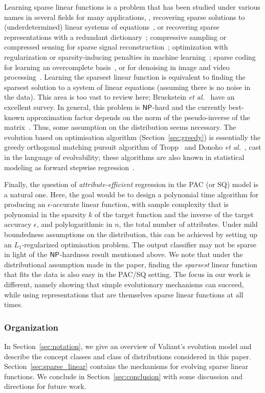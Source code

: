 Learning sparse linear functions is a problem that has been studied under
various names in several fields for many applications, \eg, recovering sparse
solutions to (underdetermined) linear systems of
equations~\cite{Donoho:2009-sparse}, or recovering sparse representations with a
redundant dictionary~\cite{Mallat:2008,Elad:2010}; compressive sampling or
compressed sensing for sparse signal reconstruction~\cite{Candes:2008};
optimization with regularization or sparsity-inducing penalties in machine
learning~\cite{Bach:2012}; sparse coding for learning an overcomplete
basis~\cite{Olshausen:1997}, or for denoising in image and video
processing~\cite{Elad:2010}. Learning the sparsest linear function is equivalent
to finding the sparsest solution to a system of linear equations (assuming there
is no noise in the data). This area is too vast to review here; Bruckstein
\emph{et al.}~\cite{Donoho:2009-sparse} have an excellent survey.
In general, this problem is $\mathsf{NP}$-hard and the
currently best-known approximation factor depends on the norm of the
pseudo-inverse of the matrix~\cite{Natarajan:1995}. Thus, some assumption on the
distribution seems necessary. The evolution based on
optimisation algorithm (Section~\ref{sec:greedy}) is essentially the greedy
orthogonal matching pursuit algorithm of Tropp~\cite{Tropp:2004-greed} and
Donoho \emph{et al.}~\cite{Donoho:2006-recovery}, cast in the language of
evolvability; these algorithms are also known in statistical modeling
as forward stepwise regression~\cite{Daniel:1999,Hastie:2001}.

Finally, the question of \emph{attribute-efficient} regression in the PAC (or
SQ) model is a natural one. Here, the goal would be to design a polynomial time
algorithm for producing an $\epsilon$-accurate linear function, with sample
complexity that is polynomial in the sparsity $k$ of the target function and
the inverse of the target accuracy $\epsilon$,
and polylogarithmic in $n$, the total number of attributes. Under
mild boundedness assumptions on the distribution, this can be achieved by
setting up an $L_1$-regularized optimisation problem. The output classifier may
not be sparse in light of the $\mathsf{NP}$-hardness result mentioned above. We note
that under the distributional assumption made in the paper, finding the
\emph{sparsest} linear function that fits the data is also easy in the PAC/SQ
setting.  The focus in our work is different, namely showing that simple
evolutionary mechanisms can succeed, while using representations that are
themselves sparse linear functions at all times.

\subsubsection*{Organization}

In Section~\ref{sec:notation}, we give an overview of Valiant's evolution model
and describe the concept classes and class of distributions considered in this
paper.  Section~\ref{sec:sparse_linear} contains the mechanisms for evolving
sparse linear functions. We conclude in Section~\ref{sec:conclusion} with some
discussion and directions for future work.
